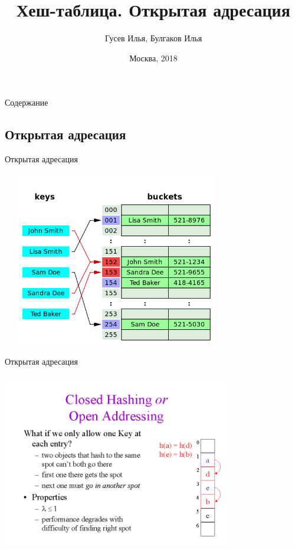 \documentclass[10pt]{beamer}
\title[\href{https://goo.gl/NRgp8K}{https://goo.gl/NRgp8K} (Term 1)]{Хеш-таблица. Открытая адресация}
\author[Гусев Илья, Булгаков Илья]{Гусев Илья, Булгаков Илья}
\institute[МФТИ] 
{Московский физико-технический институт\\*}
\date{Москва, 2018}
\begin{document}
\begin{frame}
  \titlepage
\end{frame}

\begin{frame}{Содержание}
\tableofcontents
\end{frame}

\subsection{Открытая адресация}

\begin{frame}[fragile]{Открытая адресация}
\begin{center}
    \includegraphics[width=10cm, height=7.7cm]{Term_1/Source/Pirctures/open.png}
\end{center}
\end{frame}

\begin{frame}[fragile]{Открытая адресация}
\begin{center}
    \includegraphics[width=10cm, height=7.7cm]{Term_1/Source/Pirctures/img012.png}
\end{center}
\end{frame}
\end{document}
